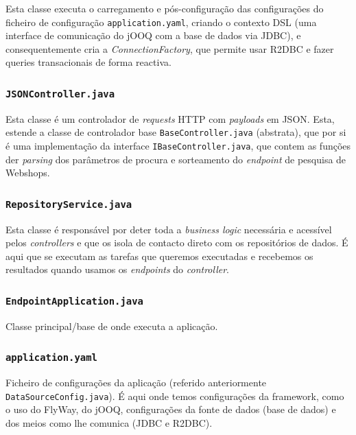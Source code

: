 Esta classe executa o carregamento e pós-configuração das configurações do ficheiro de configuração \texttt{application.yaml}, criando o contexto DSL (uma interface de comunicação do jOOQ com a base de dados via JDBC), e consequentemente cria a \textit{ConnectionFactory}, que permite usar R2DBC e fazer queries transacionais de forma reactiva.

\subsubsection*{\texttt{JSONController.java}}

Esta classe é um controlador de \textit{requests} HTTP com \textit{payloads} em JSON. Esta, estende a classe de controlador base \texttt{BaseController.java} (abstrata), que por si é uma implementação da interface \texttt{IBaseController.java}, que contem as funções der \textit{parsing} dos parâmetros de procura e sorteamento do \textit{endpoint} de pesquisa de Webshops.

\subsubsection*{\texttt{RepositoryService.java}}

Esta classe é responsável por deter toda a \textit{business logic} necessária e acessível pelos \textit{controllers} e que os isola de contacto direto com os repositórios de dados. É aqui que se executam as tarefas que queremos executadas e recebemos os resultados quando usamos os \textit{endpoints} do \textit{controller}.

\newpage

\subsubsection*{\texttt{EndpointApplication.java}}

Classe principal/base de onde executa a aplicação.

\subsubsection*{\texttt{application.yaml}}

Ficheiro de configurações da aplicação (referido anteriormente \texttt{DataSourceConfig.java}). É aqui onde temos configurações da framework, como o uso do FlyWay, do jOOQ, configurações da fonte de dados (base de dados) e dos meios como lhe comunica (JDBC e R2DBC).

